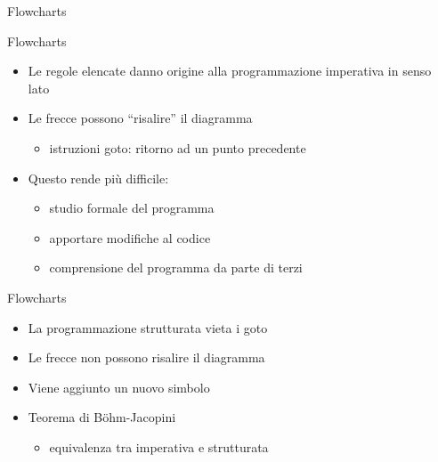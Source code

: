 \begin{frame}{Flowcharts}
  \vfill
  \begin{center}\end{center}
  \vfill
\end{frame}

\begin{frame}{Flowcharts}
  \vfill
  \begin{itemize}
    \item Le regole elencate danno origine alla programmazione imperativa in senso lato
    \vfill
    \item Le frecce possono ``risalire'' il diagramma
    \begin{itemize}
      \item istruzioni \alert{goto}: ritorno ad un punto precedente
    \end{itemize}
    \vfill
    \item Questo rende più difficile:
    \begin{itemize}
      \item studio formale del programma
      \item apportare modifiche al codice
      \item comprensione del programma da parte di terzi
    \end{itemize}
  \end{itemize}
\end{frame}

\begin{frame}{Flowcharts}
  \vfill
  \begin{itemize}
    \item La programmazione \alert{strutturata} vieta i goto
    \vfill
    \item Le frecce non possono risalire il diagramma
    \vfill
    \item Viene aggiunto un nuovo simbolo
    \vfill
    \item Teorema di Böhm-Jacopini
    \begin{itemize}
      \item \alert{equivalenza} tra imperativa e strutturata
    \end{itemize}
  \end{itemize}
\end{frame}

